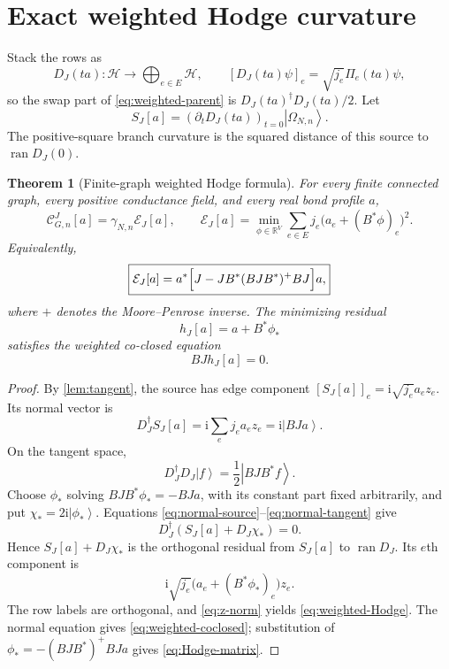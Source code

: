 \documentclass[11pt]{article}
\newtheorem{theorem}{Theorem}[section]
\theoremstyle{definition}
\theoremstyle{remark}
\newcommand{\ket}[1]{\left|#1\right\rangle}
\newcommand{\I}{\mathrm i}
\newcommand{\R}{\mathbb R}
\newcommand{\cH}{\mathcal H}
\newcommand{\cC}{\mathcal C}
\newcommand{\cE}{\mathcal E}
\newcommand{\ran}{\operatorname{ran}}
\begin{document}
\section{Exact weighted Hodge curvature}
\label{sec:Hodge}

Stack the rows as
\begin{equation}
 D_J(ta):\cH\longrightarrow\bigoplus_{e\in E}\cH,
 \qquad
 [D_J(ta)\psi]_e=\sqrt{j_e}\Pi_e(ta)\psi,
 \label{eq:Dstack}
\end{equation}
so the swap part of \eqref{eq:weighted-parent} is $D_J(ta)^\dagger D_J(ta)/2$.  Let
\begin{equation}
 S_J[a]=(\partial_tD_J(ta))_{t=0}\ket{\Omega_{N,n}}.
\end{equation}
The positive-square branch curvature is the squared distance of this source to $\ran D_J(0)$.

\begin{theorem}[Finite-graph weighted Hodge formula]
\label{thm:weighted-Hodge}
For every finite connected graph, every positive conductance field, and every real bond profile $a$,
\begin{equation}
 \boxed{
 \cC_{G,n}^{J}[a]
 =\gamma_{N,n}\cE_J[a],
 \qquad
 \cE_J[a]=\min_{\phi\in\R^V}
 \sum_{e\in E}j_e\bigl(a_e+(B^*\phi)_e\bigr)^2.}
 \label{eq:weighted-Hodge}
\end{equation}
Equivalently,
\begin{equation}
 \boxed{
 \cE_J[a]
 =a^*\Bigl[J-JB^*(BJB^*)^+BJ\Bigr]a,}
 \label{eq:Hodge-matrix}
\end{equation}
where $+$ denotes the Moore--Penrose inverse.  The minimizing residual
\begin{equation}
 h_J[a]=a+B^*\phi_*
 \label{eq:weighted-harmonic}
\end{equation}
satisfies the weighted co-closed equation
\begin{equation}
 BJh_J[a]=0.
 \label{eq:weighted-coclosed}
\end{equation}
\end{theorem}

\begin{proof}
By \cref{lem:tangent}, the source has edge component
$[S_J[a]]_e=\I\sqrt{j_e}a_ez_e$.  Its normal vector is
\begin{equation}
 D_J^\dagger S_J[a]
 =\I\sum_ej_ea_ez_e
 =\I\ket{BJa}.
 \label{eq:normal-source}
\end{equation}
On the tangent space,
\begin{equation}
 D_J^\dagger D_J\ket f
 =\frac12\ket{BJB^*f}.
 \label{eq:normal-tangent}
\end{equation}
Choose $\phi_*$ solving
$BJB^*\phi_*=-BJa$, with its constant part fixed arbitrarily, and put
$\chi_*=2\I\ket{\phi_*}$.  Equations \eqref{eq:normal-source}--\eqref{eq:normal-tangent} give
\[
 D_J^\dagger(S_J[a]+D_J\chi_*)=0.
\]
Hence $S_J[a]+D_J\chi_*$ is the orthogonal residual from $S_J[a]$ to $\ran D_J$.  Its $e$th component is
\[
 \I\sqrt{j_e}\bigl(a_e+(B^*\phi_*)_e\bigr)z_e.
\]
The row labels are orthogonal, and \eqref{eq:z-norm} yields \eqref{eq:weighted-Hodge}.  The normal equation gives \eqref{eq:weighted-coclosed}; substitution of
$\phi_*=-(BJB^*)^+BJa$ gives \eqref{eq:Hodge-matrix}.
\end{proof}
\end{document}
